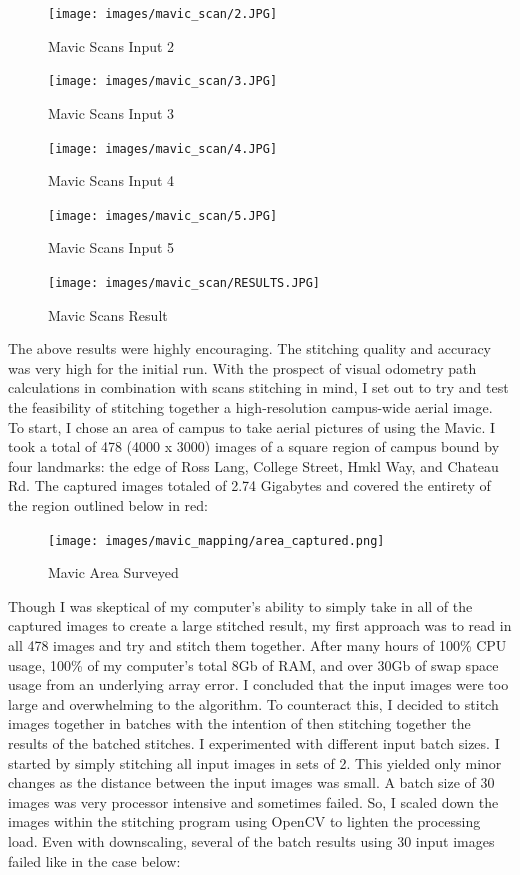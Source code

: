 \begin{figure}[htbp]
\centering
\texttt{[image: images/mavic\_scan/2.JPG]}
\caption{Mavic Scans Input 2}
\end{figure}

\begin{figure}[htbp]
\centering
\texttt{[image: images/mavic\_scan/3.JPG]}
\caption{Mavic Scans Input 3}
\end{figure}

\begin{figure}[htbp]
\centering
\texttt{[image: images/mavic\_scan/4.JPG]}
\caption{Mavic Scans Input 4}
\end{figure}

\begin{figure}[htbp]
\centering
\texttt{[image: images/mavic\_scan/5.JPG]}
\caption{Mavic Scans Input 5}
\end{figure}

\begin{figure}[htbp]
\centering
\texttt{[image: images/mavic\_scan/RESULTS.JPG]}
\caption{Mavic Scans Result}
\end{figure}

The above results were highly encouraging. The stitching quality and accuracy was very high for the initial run. With the prospect of visual odometry path calculations in combination with scans stitching in mind, I set out to try and test the feasibility of stitching together a high-resolution campus-wide aerial image. To start, I chose an area of campus to take aerial pictures of using the Mavic. I took a total of 478 (4000 x 3000) images of a square region of campus bound by four landmarks: the edge of Ross Lang, College Street, Hmkl Way, and Chateau Rd. The captured images totaled of 2.74 Gigabytes and covered the entirety of the region outlined below in red:

\begin{figure}[htbp]
\centering
\texttt{[image: images/mavic\_mapping/area\_captured.png]}
\caption{Mavic Area Surveyed}
\end{figure}

Though I was skeptical of my computer's ability to simply take in all of the captured images to create a large stitched result, my first approach was to read in all 478 images and try and stitch them together. After many hours of 100\% CPU usage, 100\% of my computer's total 8Gb of RAM, and over 30Gb of swap space usage from an underlying array error. I concluded that the input images were too large and overwhelming to the algorithm. To counteract this, I decided to stitch images together in batches with the intention of then stitching together the results of the batched stitches. I experimented with different input batch sizes. I started by simply stitching all input images in sets of 2. This yielded only minor changes as the distance between the input images was small. A batch size of 30 images was very processor intensive and sometimes failed. So, I scaled down the images within the stitching program using OpenCV to lighten the processing load. Even with downscaling, several of the batch results using 30 input images failed like in the case below: 

